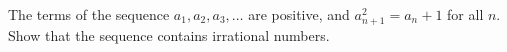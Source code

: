 The terms of the sequence $a_1, a_2, a_3, \ldots$ are positive, and $a_{n+1}^2 = a_n + 1$ for all $n$. Show that the sequence contains irrational numbers.
